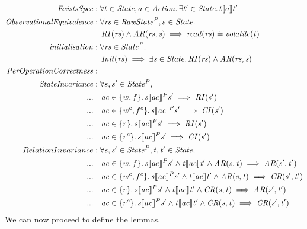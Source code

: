 \documentclass[a4paper,11pt]{article}
\theoremstyle{definition}
\begin{document}
\begin{align*}
	\mathit{ExistsSpec} &: \forall t \in \mathit{State}, a \in \mathit{Action} \ldotp \exists t' \in \mathit{State} \ldotp t \llbracket a \rrbracket t'\\
	\mathit{Observational Equivalence} &: \forall \mathit{rs} \in \mathit{RawState^P},s \in \mathit{State} \ldotp\\
	 & \quad \mathit{RI(rs)} \land \mathit{AR(rs, s)} \implies \mathit{read(rs)} \doteq \mathit{volatile(t)}\\
	\mathit{initialisation} &: \forall \mathit{rs} \in \mathit{State^P} \ldotp\\
	 &\quad \mathit{Init(rs) \implies \exists s \in State \ldotp RI(rs) \land AR(rs, s)}\\
	\mathit{PerOperationCorrectness} &:\\
	 \mathit{StateInvariance} &: \forall s, s' \in \mathit{State^P},\\
	...	 &\quad \mathit{ac} \in \{w, f\} \ldotp \mathit{s \llbracket ac \rrbracket^P s' \implies RI(s')}\\
	...	 &\quad \mathit{ac} \in \{w^c, f^c\} \ldotp \mathit{s \llbracket ac \rrbracket^P s' \implies CI(s')}\\
	...	 &\quad \mathit{ac} \in \{r\} \ldotp \mathit{s \llbracket ac \rrbracket^P s' \implies RI(s')}\\
	...	 &\quad \mathit{ac} \in \{r^c\} \ldotp \mathit{s \llbracket ac \rrbracket^P s' \implies CI(s')}\\
	RelationInvariance &: \mathit{\forall s, s' \in State^P, t, t' \in State,}\\
	...	& \quad \mathit{ac} \in \{w, f\} \ldotp \mathit{s \llbracket ac \rrbracket^P s' \land t \llbracket ac \rrbracket t' \land AR(s, t) \implies AR(s', t')}\\
	...	& \quad \mathit{ac} \in \{w^c, f^c\} \ldotp \mathit{s \llbracket ac \rrbracket^P s' \land t \llbracket ac \rrbracket t' \land AR(s, t) \implies CR(s', t')}\\
	...	& \quad \mathit{ac} \in \{r\} \ldotp \mathit{s \llbracket ac \rrbracket^P s' \land t \llbracket ac \rrbracket t' \land CR(s, t) \implies AR(s', t')}\\
	...	& \quad \mathit{ac} \in \{r^c\} \ldotp \mathit{s \llbracket ac \rrbracket^P s' \land t \llbracket ac \rrbracket t' \land CR(s, t) \implies CR(s', t')}\\
\end{align*}
We can now proceed to define the lemmas.
\end{document}
